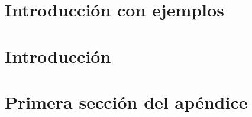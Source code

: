 \documentclass[11pt,a4paper]{article}
\begin{document}
\clearpage
\thispagestyle{empty}
\tableofcontents


\newpage


\section{Introducci\'on con ejemplos}


\newpage
\section{Introducci\'on}

\newpage

{\small


}


\newpage
\appendix

\section{Primera sección del apéndice}

%
\end{document}
